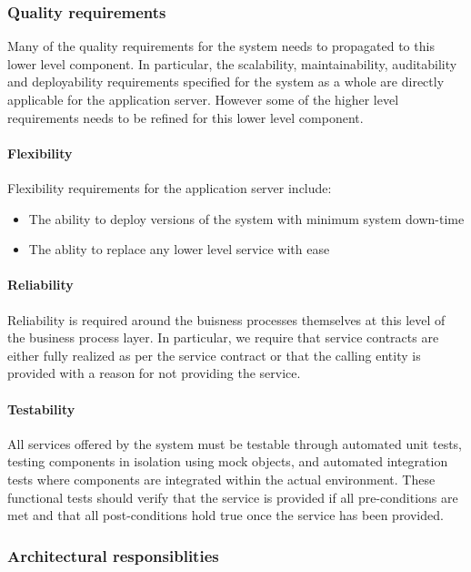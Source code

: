 \documentclass[a4paper,12pt]{report}
\begin{document}
\subsubsection {Quality requirements}
Many of the quality requirements for the system needs to propagated to this lower level component.
In particular, the scalability, maintainability, auditability and deployability requirements specified for the system as a whole are directly applicable for the application server. However some of the higher level requirements needs to be refined for this lower level component.

\paragraph {Flexibility} 
\hfill \break
 Flexibility requirements for the application server include:
	\begin{itemize}
		\item The ability to deploy versions of the system with minimum system down-time
		\item The ablity to replace any lower level service with ease
	\end{itemize}
\paragraph {Reliability}
\hfill \break
	Reliability is required around the buisness processes themselves at this level of the business process layer.
	In particular, we require that service contracts are either fully realized as per the service contract or that the calling entity is provided with a reason  for not providing the service.

\paragraph {Testability}
\hfill \break
All services offered by the system must be testable through automated unit tests, testing components in isolation using mock objects, and automated integration tests where components are integrated within the actual environment.
These functional tests should verify that the service is provided if all pre-conditions are met and that all post-conditions hold true once the service has been provided.

\FloatBarrier
\subsubsection {Architectural responsiblities}
\end{document}
